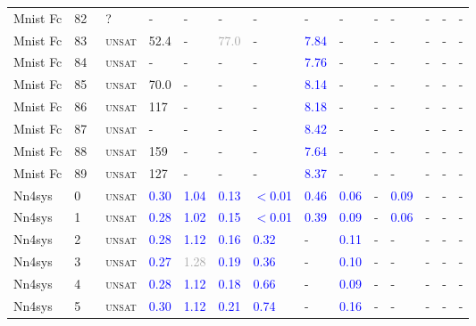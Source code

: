 \begin{center}
{\begin{longtable}{@{}llllllllllllll@{}}
Mnist Fc & 82 & ~? & - & - & - & - & - & - & - & - & - & - & - \\
Mnist Fc & 83 & ~\textsc{unsat} & \textcolor{second}{52.4} & - & \textcolor{darkgray}{77.0} & - & \textcolor{blue}{7.84} & - & - & - & - & - & - \\
Mnist Fc & 84 & ~\textsc{unsat} & - & - & - & - & \textcolor{blue}{7.76} & - & - & - & - & - & - \\
Mnist Fc & 85 & ~\textsc{unsat} & \textcolor{second}{70.0} & - & - & - & \textcolor{blue}{8.14} & - & - & - & - & - & - \\
Mnist Fc & 86 & ~\textsc{unsat} & \textcolor{second}{117} & - & - & - & \textcolor{blue}{8.18} & - & - & - & - & - & - \\
Mnist Fc & 87 & ~\textsc{unsat} & - & - & - & - & \textcolor{blue}{8.42} & - & - & - & - & - & - \\
Mnist Fc & 88 & ~\textsc{unsat} & \textcolor{second}{159} & - & - & - & \textcolor{blue}{7.64} & - & - & - & - & - & - \\
Mnist Fc & 89 & ~\textsc{unsat} & \textcolor{second}{127} & - & - & - & \textcolor{blue}{8.37} & - & - & - & - & - & - \\
\midrule
Nn4sys & 0 & ~\textsc{unsat} & \textcolor{blue}{0.30} & \textcolor{blue}{1.04} & \textcolor{blue}{0.13} & \textcolor{blue}{$<$0.01} & \textcolor{blue}{0.46} & \textcolor{blue}{0.06} & - & \textcolor{blue}{0.09} & - & - & - \\
Nn4sys & 1 & ~\textsc{unsat} & \textcolor{blue}{0.28} & \textcolor{blue}{1.02} & \textcolor{blue}{0.15} & \textcolor{blue}{$<$0.01} & \textcolor{blue}{0.39} & \textcolor{blue}{0.09} & - & \textcolor{blue}{0.06} & - & - & - \\
Nn4sys & 2 & ~\textsc{unsat} & \textcolor{blue}{0.28} & \textcolor{blue}{1.12} & \textcolor{blue}{0.16} & \textcolor{blue}{0.32} & - & \textcolor{blue}{0.11} & - & - & - & - & - \\
Nn4sys & 3 & ~\textsc{unsat} & \textcolor{blue}{0.27} & \textcolor{darkgray}{1.28} & \textcolor{blue}{0.19} & \textcolor{blue}{0.36} & - & \textcolor{blue}{0.10} & - & - & - & - & - \\
Nn4sys & 4 & ~\textsc{unsat} & \textcolor{blue}{0.28} & \textcolor{blue}{1.12} & \textcolor{blue}{0.18} & \textcolor{blue}{0.66} & - & \textcolor{blue}{0.09} & - & - & - & - & - \\
Nn4sys & 5 & ~\textsc{unsat} & \textcolor{blue}{0.30} & \textcolor{blue}{1.12} & \textcolor{blue}{0.21} & \textcolor{blue}{0.74} & - & \textcolor{blue}{0.16} & - & - & - & - & - \\

\end{longtable}}
\end{center}
